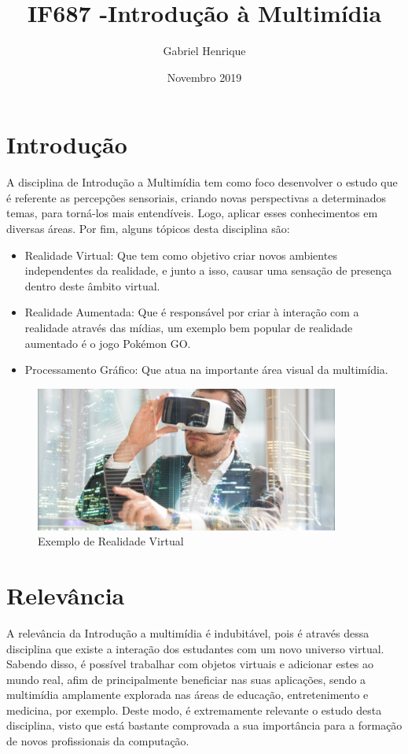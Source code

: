 \documentclass{article}
\title{IF687 -Introdução à Multimídia}
\author{Gabriel Henrique}
\date{Novembro 2019}
\begin{document}
\maketitle

\section{Introdução}
A disciplina de Introdução a Multimídia tem como foco desenvolver o estudo que é referente as percepções sensoriais, criando novas perspectivas a determinados temas, para torná-los mais entendíveis. Logo, aplicar esses conhecimentos em diversas áreas. Por fim, alguns tópicos desta disciplina são: 
\begin{itemize}
    \item Realidade Virtual: Que tem como objetivo criar novos ambientes independentes da realidade, e junto a isso, causar uma sensação de presença dentro deste âmbito virtual. 
    \item Realidade Aumentada: Que é responsável por criar à interação com a realidade através das mídias, um exemplo bem popular de realidade aumentado é o jogo Pokémon GO.
    \item Processamento Gráfico: Que atua na importante área visual da multimídia.
\end{itemize}

\begin{figure}[h!]
\centering
\includegraphics[width=100mm]{virtua.jpg}
\caption{Exemplo de Realidade Virtual}
\label{fig:Realidade Virtual}
\end{figure}

\section{Relevância}
A relevância da Introdução a multimídia é indubitável, pois é através dessa disciplina que existe a interação dos estudantes com um novo universo virtual. Sabendo disso, é possível trabalhar com objetos virtuais e adicionar estes ao mundo real, afim de principalmente beneficiar nas suas aplicações, sendo a multimídia amplamente explorada nas áreas de educação, entretenimento e medicina, por exemplo. Deste modo, é extremamente relevante o estudo desta disciplina, visto que está bastante comprovada a sua importância para a formação de novos profissionais da computação.
\end{document}
